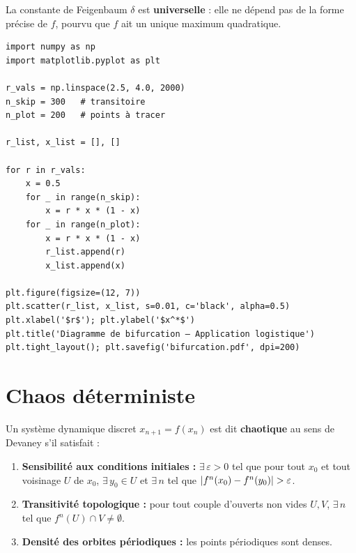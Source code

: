 \begin{remarque}
La constante de Feigenbaum $\delta$ est \textbf{universelle} : elle
ne d\'epend pas de la forme pr\'ecise de $f$, pourvu que $f$ ait
un unique maximum quadratique.
\end{remarque}

\begin{codeblock}[title=\textbf{Diagramme de bifurcation de l'application logistique}]
\begin{verbatim}
import numpy as np
import matplotlib.pyplot as plt

r_vals = np.linspace(2.5, 4.0, 2000)
n_skip = 300   # transitoire
n_plot = 200   # points à tracer

r_list, x_list = [], []

for r in r_vals:
    x = 0.5
    for _ in range(n_skip):
        x = r * x * (1 - x)
    for _ in range(n_plot):
        x = r * x * (1 - x)
        r_list.append(r)
        x_list.append(x)

plt.figure(figsize=(12, 7))
plt.scatter(r_list, x_list, s=0.01, c='black', alpha=0.5)
plt.xlabel('$r$'); plt.ylabel('$x^*$')
plt.title('Diagramme de bifurcation — Application logistique')
plt.tight_layout(); plt.savefig('bifurcation.pdf', dpi=200)
\end{verbatim}
\end{codeblock}

\section{Chaos d\'eterministe}
\label{sec:chaos_def}

\begin{definition}
Un syst\`eme dynamique discret $x_{n+1}=f(x_n)$ est dit
\textbf{chaotique} au sens de Devaney s'il satisfait :
\begin{enumerate}
  \item \textbf{Sensibilit\'e aux conditions initiales :}
    $\exists\,\varepsilon>0$ tel que pour tout $x_0$ et tout
    voisinage $U$ de $x_0$, $\exists\,y_0\in U$ et $\exists\,n$
    tel que $\abs{f^n(x_0)-f^n(y_0)}>\varepsilon$.
  \item \textbf{Transitivit\'e topologique :} pour tout couple
    d'ouverts non vides $U,V$, $\exists\,n$ tel que
    $f^n(U)\cap V\neq\emptyset$.
  \item \textbf{Densit\'e des orbites p\'eriodiques :} les points
    p\'eriodiques sont denses.
\end{enumerate}
\end{definition}

